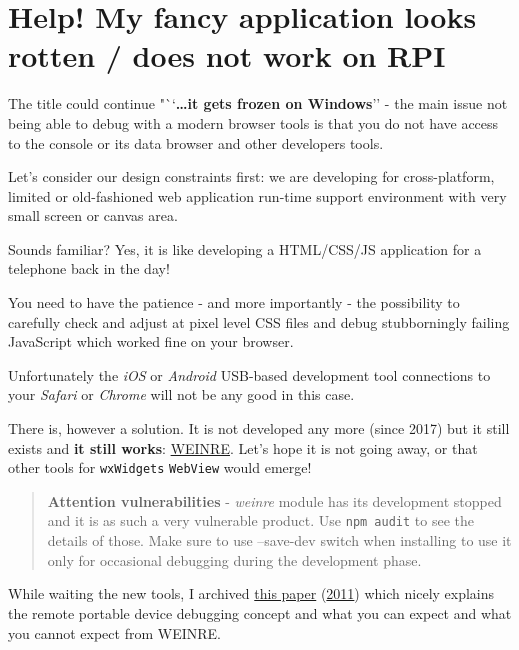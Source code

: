 \documentclass[11pt]{article}
\begin{document}
    \hypertarget{help-my-fancy-application-looks-rotten-does-not-work-on-rpi}{%
\section{Help! My fancy application looks rotten / does not work on
RPI}\label{help-my-fancy-application-looks-rotten-does-not-work-on-rpi}}

    The title could continue "``\textbf{\ldots it gets frozen on Windows}''
- the main issue not being able to debug with a modern browser tools is
that you do not have access to the console or its data browser and other
developers tools.

    Let's consider our design constraints first: we are developing for
cross-platform, limited or old-fashioned web application run-time
support environment with very small screen or canvas area.

    Sounds familiar? Yes, it is like developing a HTML/CSS/JS application
for a telephone back in the day!

    You need to have the patience - and more importantly - the possibility
to carefully check and adjust at pixel level CSS files and debug
stubborningly failing JavaScript which worked fine on your browser.

    Unfortunately the \emph{iOS} or \emph{Android} USB-based development
tool connections to your \emph{Safari} or \emph{Chrome} will not be any
good in this case.

    There is, however a solution. It is not developed any more (since 2017)
but it still exists and \textbf{it still works}:
\href{https://people.apache.org/~pmuellr/weinre/docs/latest/}{WEINRE}.
Let's hope it is not going away, or that other tools for
\texttt{wxWidgets} \texttt{WebView} would emerge!

    \begin{quote}
\textbf{Attention vulnerabilities} - \emph{weinre} module has its
development stopped and it is as such a very vulnerable product. Use
\texttt{npm\ audit} to see the details of those. Make sure to use
--save-dev switch when installing to use it only for occasional
debugging during the development phase.
\end{quote}

    While waiting the new tools, I archived
\href{pdf/debugging_mobile_javascript_with_WEINRE_ibm_blog_2011.pdf}{this
paper}
(\href{https://www.ibm.com/developerworks/community/blogs/94e7fded-7162-445e-8ceb-97a2140866a9/entry/debugging_mobile_javascript_with_weinre?lang=en}{2011})
which nicely explains the remote portable device debugging concept and
what you can expect and what you cannot expect from WEINRE.
\end{document}
